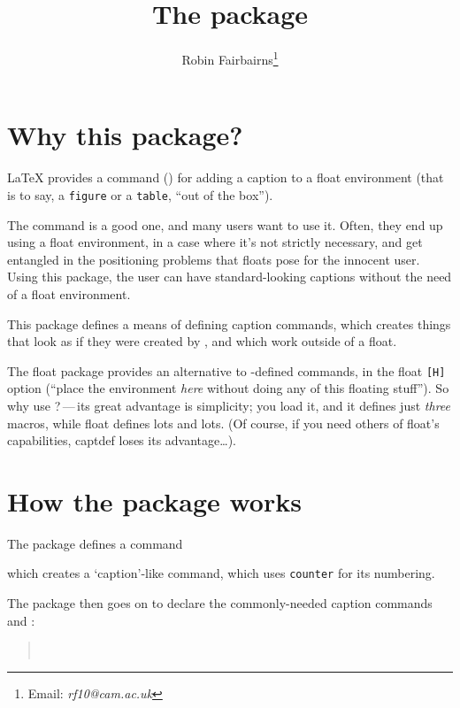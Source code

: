 \documentclass[a4paper]{article}
\begin{document}
\title{The  package}
\author{Robin Fairbairns\thanks{Email: \emph{rf10@cam.ac.uk}}}
\maketitle

\section{Why this package?}

\LaTeX{} provides a command () for adding a caption to a
float environment (that is to say, a \texttt{figure} or a
\texttt{table}, ``out of the box'').

The command is a good one, and many users want to use it.  Often,
they end up using a float environment, in a case where it's not
strictly necessary, and get entangled in the positioning problems
that floats pose for the innocent user.  Using this package, the
user can have standard-looking captions without the need of a float
environment.

This package defines a means of defining caption commands, which
creates things that look as if they were created by , and
which work outside of a float.

The \textsf{float} package provides an alternative to
-defined commands, in the float \texttt{[H]} option
(``place the environment \emph{here} without doing any of this
floating stuff'').  So why use ?\,---\,its great
advantage is simplicity; you load it, and it defines just \emph{three}
macros, while \textsf{float} defines lots and lots.  (Of course, if
you need others of \textsf{float}'s capabilities, \textsf{captdef}
loses its advantage\dots).

\section{How the package works}

The package defines a command
\begin{quote}
\end{quote}
which creates a `caption'-like command, which uses \texttt{counter}
for its numbering.

The package then goes on to declare the commonly-needed caption
commands  and :
\begin{quote}
  \\
\end{quote}
\end{document}
